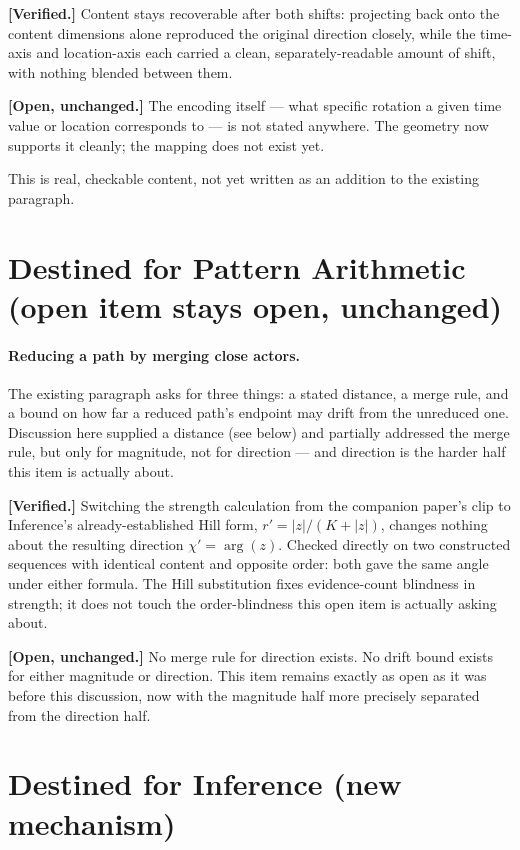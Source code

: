 \documentclass[11pt]{article}
\begin{document}
\textbf{[Verified.]} Content stays recoverable after both shifts:
projecting back onto the content dimensions alone reproduced the
original direction closely, while the time-axis and location-axis
each carried a clean, separately-readable amount of shift, with
nothing blended between them.

\textbf{[Open, unchanged.]} The encoding itself --- what specific
rotation a given time value or location corresponds to --- is not
stated anywhere. The geometry now supports it cleanly; the mapping
does not exist yet.

This is real, checkable content, not yet written as an addition to
the existing paragraph.

\section{Destined for Pattern Arithmetic (open item stays open, unchanged)}

\paragraph{Reducing a path by merging close actors.} The existing
paragraph asks for three things: a stated distance, a merge rule, and
a bound on how far a reduced path's endpoint may drift from the
unreduced one. Discussion here supplied a distance (see below) and
partially addressed the merge rule, but only for magnitude, not for
direction --- and direction is the harder half this item is actually
about.

\textbf{[Verified.]} Switching the strength calculation from the
companion paper's clip to Inference's already-established Hill form,
$r'=|z|/(K+|z|)$, changes nothing about the resulting direction
$\chi'=\arg(z)$. Checked directly on two constructed sequences with
identical content and opposite order: both gave the same angle under
either formula. The Hill substitution fixes evidence-count blindness
in strength; it does not touch the order-blindness this open item is
actually asking about.

\textbf{[Open, unchanged.]} No merge rule for direction exists. No
drift bound exists for either magnitude or direction. This item
remains exactly as open as it was before this discussion, now with
the magnitude half more precisely separated from the direction half.

\section{Destined for Inference (new mechanism)}
\end{document}
